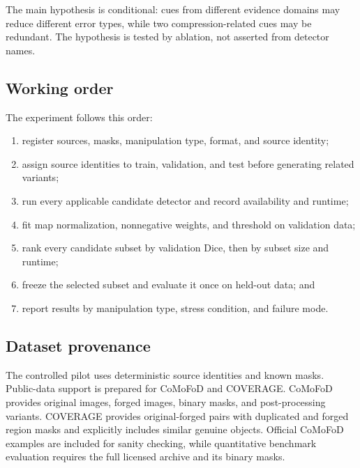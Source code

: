 \documentclass[sigconf,nonacm]{acmart}
\begin{document}
The main hypothesis is conditional: cues from different evidence domains may reduce different error types, while two compression-related cues may be redundant. The hypothesis is tested by ablation, not asserted from detector names.

\subsection{Working order}
The experiment follows this order:
\begin{enumerate}[leftmargin=*]
  \item register sources, masks, manipulation type, format, and source identity;
  \item assign source identities to train, validation, and test before generating related variants;
  \item run every applicable candidate detector and record availability and runtime;
  \item fit map normalization, nonnegative weights, and threshold on validation data;
  \item rank every candidate subset by validation Dice, then by subset size and runtime;
  \item freeze the selected subset and evaluate it once on held-out data; and
  \item report results by manipulation type, stress condition, and failure mode.
\end{enumerate}

\subsection{Dataset provenance}
The controlled pilot uses deterministic source identities and known masks. Public-data support is prepared for CoMoFoD and COVERAGE. CoMoFoD provides original images, forged images, binary masks, and post-processing variants. COVERAGE provides original-forged pairs with duplicated and forged region masks and explicitly includes similar genuine objects. Official CoMoFoD examples are included for sanity checking, while quantitative benchmark evaluation requires the full licensed archive and its binary masks.
\end{document}
